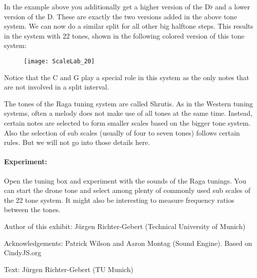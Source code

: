 In the example above you additionally get a higher version of the D$\flat$   and a lower version of the D. These are exactly the two versions added in the above tone system. We can now do a similar split for all other big halftone steps. This results in the system with 22 tones, shown in the following colored version of this tone system:

\begin{figure}[h]
\centering
\texttt{[image: ScaleLab\_20]}
\end{figure}

Notice that the C and G play a special role in this system as the only notes that are not involved in a split interval.

The tones of the Raga tuning system are called Shrutis. As in the Western tuning systems, often a melody does not make use of all tones at the same time. Instead, certain notes are selected to form smaller scales based on the bigger tone system. Also the selection of sub scales (usually of four to seven tones) follows certain rules. But we will not go into those details here.

\paragraph{Experiment:} Open the tuning box and experiment with the sounds of the Raga tunings. You can start the drone tone and select among plenty of commonly used sub scales of the 22 tone system. It might also be interesting to measure frequency ratios between the tones.

\begin{sectcredits}
\item[Author of this exhibit:] Jürgen Richter-Gebert (Technical University of Munich)
\item[Acknowledgements:] Patrick Wilson and Aaron Montag (Sound Engine). Based on CindyJS.org
\item[Text:] Jürgen Richter-Gebert (TU Munich)
\end{sectcredits}
